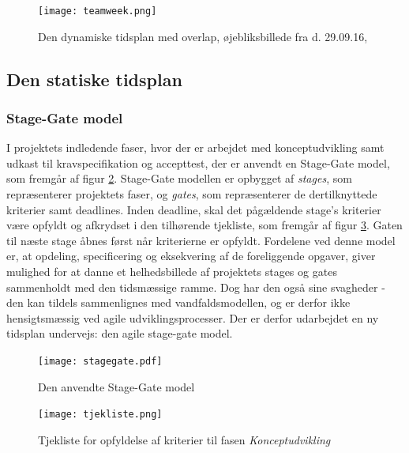 \begin{figure}
\centering
\texttt{[image: teamweek.png]}	
\caption{Den dynamiske tidsplan med overlap, øjebliksbillede fra d. 29.09.16,}
\label{fig:teamweek}
\end{figure}

\subsection{Den statiske tidsplan}
\label{subsec:statisk}
\subsubsection{Stage-Gate model}
I projektets indledende faser, hvor der er arbejdet med konceptudvikling samt udkast til kravspecifikation og accepttest, der er anvendt en Stage-Gate model, som fremgår af figur \ref{fig:stagegate}. Stage-Gate modellen er opbygget af \textit{stages}, som repræsenterer projektets faser, og \textit{gates}, som repræsenterer de dertilknyttede kriterier samt deadlines. Inden deadline, skal det pågældende stage's kriterier være opfyldt og afkrydset i den tilhørende tjekliste, som fremgår af figur \ref{fig:tjekliste}. Gaten til næste stage åbnes først når kriterierne er opfyldt. Fordelene ved denne model er, at opdeling, specificering og eksekvering af de foreliggende opgaver, giver mulighed for at danne et helhedsbillede af projektets stages og gates sammenholdt med den tidsmæssige ramme. Dog har den også sine svagheder - den kan tildels sammenlignes med vandfaldsmodellen, og er derfor ikke hensigtsmæssig ved agile udviklingsprocesser. Der er derfor udarbejdet en ny tidsplan undervejs: den agile stage-gate model. 

\newpage
\begin{landscape}
\begin{figure}
\centering	
\texttt{[image: stagegate.pdf]}
\caption{Den anvendte Stage-Gate model}
\label{fig:stagegate}
\end{figure}
\end{landscape}

\begin{figure}[htb]
\centering
\texttt{[image: tjekliste.png]}
\caption{Tjekliste for opfyldelse af kriterier til fasen \textit{Konceptudvikling}}
\label{fig:tjekliste}
\end{figure}

